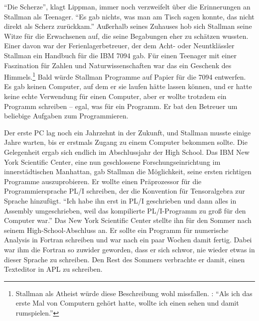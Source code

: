 "`Die Scherze"', klagt Lippman, immer noch verzweifelt über die Erinnerungen an Stallman als Teenager. "`Es gab nichts, was man am Tisch sagen konnte, das nicht direkt als Scherz zurückkam."' Außerhalb seines Zuhauses hob sich Stallman seine Witze für die Erwachsenen auf, die seine Begabungen eher zu schätzen wussten. Einer davon war der Ferienlagerbetreuer, der dem Acht- oder Neuntklässler Stallman ein Handbuch für die IBM 7094 gab. Für einen Teenager mit einer Faszination für Zahlen und Naturwissenschaften war das ein Geschenk des Himmels.\footnote{Stallman als Atheist würde diese Beschreibung wohl missfallen. \citet{rmshsm}: "`Als ich das erste Mal von Computern gehört hatte, wollte ich einen sehen und damit rumspielen."'} Bald würde Stallman Programme auf Papier für die 7094 entwerfen. Es gab keinen Computer, auf dem er sie laufen hätte lassen können, und er hatte keine echte Verwendung für einen Computer, aber er wollte trotzdem ein Programm schreiben –  egal, was für ein Programm. Er bat den Betreuer um beliebige Aufgaben zum Programmieren.

Der erste PC lag noch ein Jahrzehnt in der Zukunft, und Stallman musste einige Jahre warten, bis er erstmals Zugang zu einem Computer bekommen sollte. Die Gelegenheit ergab sich endlich im Abschlussjahr der High School. Das IBM New York Scientific Center, eine nun geschlossene Forschungseinrichtung im innerstädtischen Manhattan, gab Stallman die Möglichkeit, seine ersten richtigen Programme auszuprobieren. Er wollte einen Präprozessor für die Programmiersprache PL/I schreiben, der die Konvention für Tensoralgebra zur Sprache hinzufügt. "`Ich habe ihn erst in PL/I geschrieben und dann alles in Assembly umgeschrieben, weil das kompilierte PL/I-Programm zu groß für den Computer war."'
Das New York Scientific Center stellte ihn für den Sommer nach seinem High-School-Abschluss an. Er sollte ein Programm für numerische Analysis in Fortran schreiben und war nach ein paar Wochen damit fertig. Dabei war ihm die Fortran so zuwider geworden, dass er sich schwor, nie wieder etwas in dieser Sprache zu schreiben. Den Rest des Sommers verbrachte er damit, einen Texteditor in APL zu schreiben.

